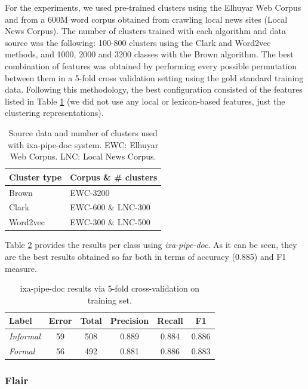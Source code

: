 \documentclass[information,article,submit,moreauthors,pdftex,10pt,a4paper]{Definitions/mdpi}
\begin{document}
For the experiments, we used pre-trained clusters using the Elhuyar Web Corpus \cite{leturia2012evaluating} and from a 600M word corpus obtained from crawling local news sites (Local News Corpus). The number of clusters trained with each algorithm and data source was the following: 100-800 clusters using the Clark and Word2vec methods, and 1000, 2000 and 3200 classes with the Brown algorithm. The best combination of features was obtained by performing every possible permutation between them in a 5-fold cross validation setting using the gold standard training data. Following this methodology, the best configuration consisted of the features listed in Table \ref{tab:clusters} (we did not use any local or lexicon-based features, just the clustering representations).

\begin{table}[H]
  \centering
  \begin{tabular}{l|l} \hline
    Cluster type & Corpus \& \# clusters\\ \hline \hline
    Brown & EWC-3200 \\
    Clark & EWC-600 \& LNC-300  \\
    Word2vec & EWC-300 \& LNC-500\\ \hline
  \end{tabular}
  \caption{Source data and number of clusters used with ixa-pipe-doc system. EWC: Elhuyar Web Corpus. LNC: Local News Corpus.}
  \label{tab:clusters}
\end{table}


Table \ref{tab:ixa-ml-garapen} provides the results per class using \emph{ixa-pipe-doc}. As it can be seen, they are the best results obtained so far both in terms of accuracy (0.885) and F1 measure.

\begin{table}[H]
  \centering
  \begin{tabular}{|l|c|c|c|c|c|}
    \hline
    \textbf{Label} & \textbf{Error} & \textbf{Total} & \textbf{Precision} & \textbf{Recall} & \textbf{F1}\\ \hline
    \textit{Informal} &  59 & 508 & 0.889  & 0.884  & 0.886\\ \hline
    \textit{Formal} &  56 & 492 & 0.881 & 0.886 & 0.883\\ \hline
  \end{tabular}
  \caption{ixa-pipe-doc results via 5-fold cross-validation on training set.}
  \label{tab:ixa-ml-garapen}
\end{table}


\subsubsection{Flair}\label{sec:neural-architecture}
\end{document}
